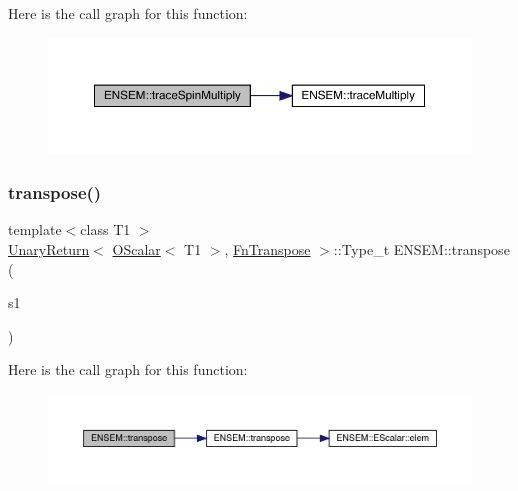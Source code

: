 Here is the call graph for this function\+:\nopagebreak
\begin{figure}[H]
\begin{center}
\leavevmode
\includegraphics[width=350pt]{d1/d71/group__obsscalar_ga4f302dae1d100fdae28fb6e784a8bc3b_cgraph}
\end{center}
\end{figure}
\mbox{\label{group__obsscalar_ga6af2d66b673bc2683558f88c9eac327e}} 
\subsubsection{\texorpdfstring{transpose()}{transpose()}}
{\footnotesize\ttfamily template$<$class T1 $>$ \\
\mbox{\hyperlink{structENSEM_1_1UnaryReturn}{Unary\+Return}}$<$ \mbox{\hyperlink{classENSEM_1_1OScalar}{O\+Scalar}}$<$ T1 $>$, \mbox{\hyperlink{structENSEM_1_1FnTranspose}{Fn\+Transpose}} $>$\+::Type\+\_\+t E\+N\+S\+E\+M\+::transpose (\begin{DoxyParamCaption}\item[{const \mbox{\hyperlink{classENSEM_1_1OScalar}{O\+Scalar}}$<$ T1 $>$ \&}]{s1 }\end{DoxyParamCaption})\hspace{0.3cm}{\ttfamily [inline]}}

Here is the call graph for this function\+:\nopagebreak
\begin{figure}[H]
\begin{center}
\leavevmode
\includegraphics[width=350pt]{d1/d71/group__obsscalar_ga6af2d66b673bc2683558f88c9eac327e_cgraph}
\end{center}
\end{figure}
\mbox{\label{group__obsscalar_gacb54937c6368c2a99fd2eaecc1221360}} 
